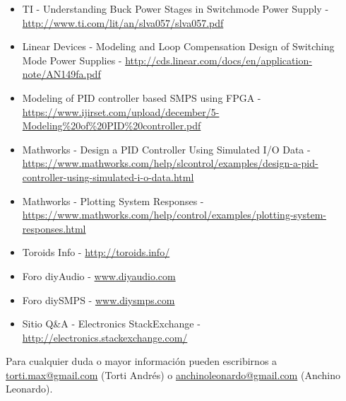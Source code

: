 \documentclass[12pt]{report}
\begin{document}
\begin{itemize}
	\item TI - Understanding Buck Power Stages in Switchmode Power Supply - \url{http://www.ti.com/lit/an/slva057/slva057.pdf}
	\item Linear Devices - Modeling and Loop Compensation Design of
	Switching Mode Power Supplies - \url{http://cds.linear.com/docs/en/application-note/AN149fa.pdf}
	\item Modeling of PID controller based SMPS using
	FPGA - \url{https://www.ijirset.com/upload/december/5-Modeling\%20of\%20PID\%20controller.pdf}
	\item Mathworks - Design a PID Controller Using Simulated I/O Data - \url{https://www.mathworks.com/help/slcontrol/examples/design-a-pid-controller-using-simulated-i-o-data.html}
	\item Mathworks - Plotting System Responses - \url{https://www.mathworks.com/help/control/examples/plotting-system-responses.html}
	\item Toroids Info - \url{http://toroids.info/}
	\item Foro diyAudio - \url{www.diyaudio.com}
	\item Foro diySMPS - \url{www.diysmps.com}
	\item Sitio Q\&A - Electronics StackExchange - \url{http://electronics.stackexchange.com/}
\end{itemize}

Para cualquier duda o mayor información pueden escribirnos a \href{mailto:torti.max@gmail.com}{torti.max@gmail.com} (Torti Andrés) o \href{mailto:anchinoleonardo@gmail.com}{anchinoleonardo@gmail.com} (Anchino Leonardo).
\end{document}
